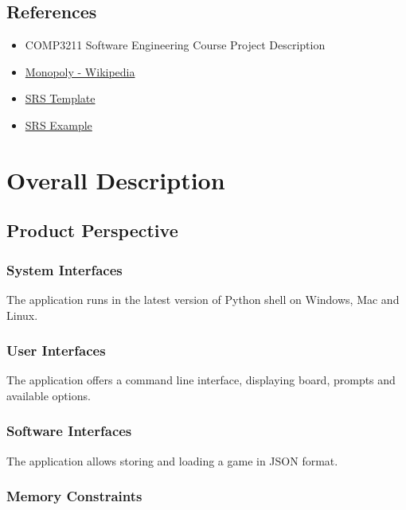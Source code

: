 \section{References}

\begin{itemize}
  \item COMP3211 Software Engineering Course Project Description
  \item \href{https://en.wikipedia.org/wiki/Monopoly_(game)}{Monopoly - Wikipedia}
  \item \href{https://www.overleaf.com/latex/templates/cse355-software-requirements-specification-layout/pvjpzxthtngc}{SRS Template}
  \item \href{https://www.reqview.com/papers/ReqView-Example_Software_Requirements_Specification_SRS_Document.pdf}{SRS Example}
\end{itemize}

\chapter{Overall Description}
\label{ch:overall-desc}

\section{Product Perspective}

\subsection{System Interfaces}

The application runs in the latest version of Python shell on Windows, Mac and Linux.

\subsection{User Interfaces}

The application offers a command line interface, displaying board, prompts and available options.

\subsection{Software Interfaces}

The application allows storing and loading a game in JSON format.

\subsection{Memory Constraints}

